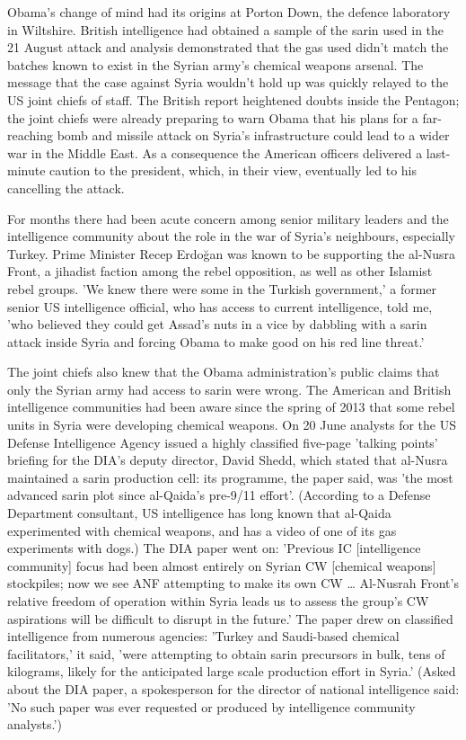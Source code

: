 Obama's change of mind had its origins at Porton Down, the defence
laboratory in Wiltshire. British intelligence had obtained a sample
of the sarin used in the 21 August attack and analysis demonstrated
that the gas used didn't match the batches known to exist in the Syrian
army's chemical weapons arsenal. The message that the case against
Syria wouldn't hold up was quickly relayed to the US joint chiefs
of staff. The British report heightened doubts inside the Pentagon;
the joint chiefs were already preparing to warn Obama that his plans
for a far-reaching bomb and missile attack on Syria's infrastructure
could lead to a wider war in the Middle East. As a consequence the
American officers delivered a last-minute caution to the president,
which, in their view, eventually led to his cancelling the attack.

For months there had been acute concern among senior military leaders
and the intelligence community about the role in the war of Syria's
neighbours, especially Turkey. Prime Minister Recep Erdo\u{g}an was
known to be supporting the al-Nusra Front, a jihadist faction among
the rebel opposition, as well as other Islamist rebel groups. 'We
knew there were some in the Turkish government,' a former senior US
intelligence official, who has access to current intelligence, told
me, 'who believed they could get Assad's nuts in a vice by dabbling
with a sarin attack inside Syria \textendash{} and forcing Obama to
make good on his red line threat.'

The joint chiefs also knew that the Obama administration's public
claims that only the Syrian army had access to sarin were wrong. The
American and British intelligence communities had been aware since
the spring of 2013 that some rebel units in Syria were developing
chemical weapons. On 20 June analysts for the US Defense Intelligence
Agency issued a highly classified five-page 'talking points' briefing
for the DIA's deputy director, David Shedd, which stated that al-Nusra
maintained a sarin production cell: its programme, the paper said,
was 'the most advanced sarin plot since al-Qaida's pre-9/11 effort'.
(According to a Defense Department consultant, US intelligence has
long known that al-Qaida experimented with chemical weapons, and has
a video of one of its gas experiments with dogs.) The DIA paper went
on: 'Previous IC {[}intelligence community{]} focus had been almost
entirely on Syrian CW {[}chemical weapons{]} stockpiles; now we see
ANF attempting to make its own CW \ldots{} Al-Nusrah Front's relative
freedom of operation within Syria leads us to assess the group's CW
aspirations will be difficult to disrupt in the future.' The paper
drew on classified intelligence from numerous agencies: 'Turkey and
Saudi-based chemical facilitators,' it said, 'were attempting to obtain
sarin precursors in bulk, tens of kilograms, likely for the anticipated
large scale production effort in Syria.' (Asked about the DIA paper,
a spokesperson for the director of national intelligence said: 'No
such paper was ever requested or produced by intelligence community
analysts.')

